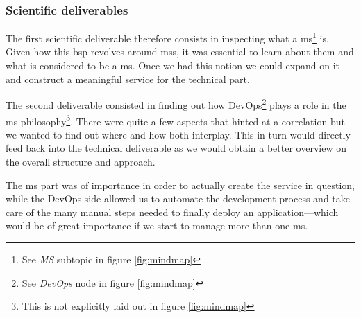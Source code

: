 \subsubsection{Scientific deliverables}

The first scientific deliverable therefore consists in inspecting what
a \gls{ms}\footnote{See \textit{MS} subtopic in figure
\ref{fig:mindmap}} is. Given how this \gls{bsp} revolves around \glspl{ms},
it was essential to learn about them and what is considered
to be a \gls{ms}. Once we had this notion we could expand on it and
construct a meaningful service for the technical part.

The second deliverable consisted in finding out how DevOps\footnote{See
\textit{DevOps} node in figure \ref{fig:mindmap}} plays a
role in the \gls{ms} philosophy\footnote{This is not explicitly laid out
in figure \ref{fig:mindmap}}. There were quite a few aspects
that hinted at a correlation but we wanted to find out where and how
both interplay. This in turn would directly feed back into the
technical deliverable as we would obtain a better overview on the
overall structure and approach.

The \gls{ms} part was of importance in order to actually create the
service in question, while the DevOps side allowed us to automate
the development process and take care of the many manual steps needed to finally
deploy an application---which would be of great importance if we start
to manage more than one \gls{ms}.




